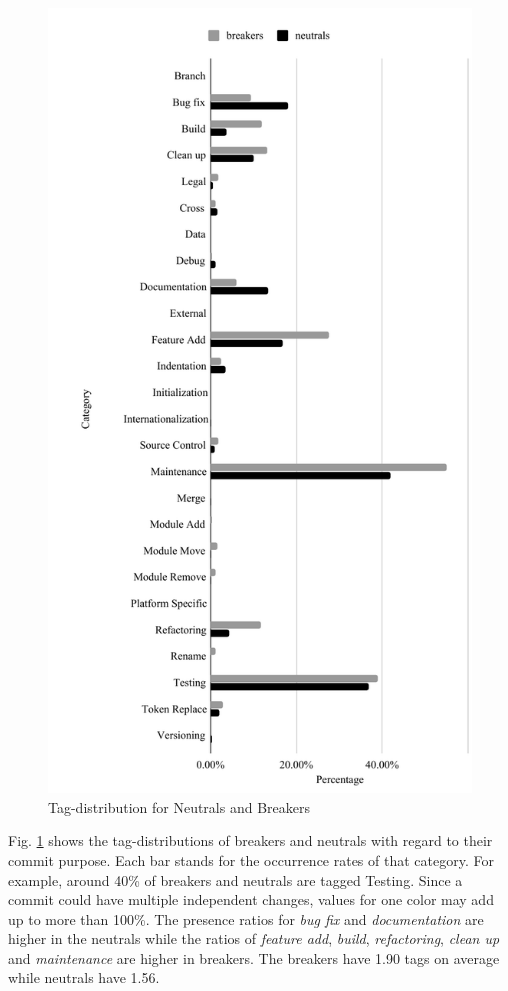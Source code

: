 \begin{figure}[htbp]
\centerline{\includegraphics[scale=0.5]{figures/breaker_neutral.pdf}}
\caption{Tag-distribution for Neutrals and Breakers}
\label{fig:breaker_neutral_distribution}
\end{figure}

Fig. \ref{fig:breaker_neutral_distribution} shows the tag-distributions of breaker{}s and neutral{}s with regard to their commit purpose.
Each bar stands for the occurrence rates of that category. 
For example, around 40\% of breaker{}s and neutral{}s are tagged Testing. 
Since a commit could have multiple independent changes, values for one color may add up to more than 100\%.
The presence ratios for \textit{bug fix} and \textit{documentation} are higher in the neutrals while the ratios of \textit{feature add}, \textit{build}, \textit{refactoring}, \textit{clean up} and \textit{maintenance} are higher in breaker{}s.
The breaker{}s have 1.90 tags on average while neutral{}s have 1.56.



